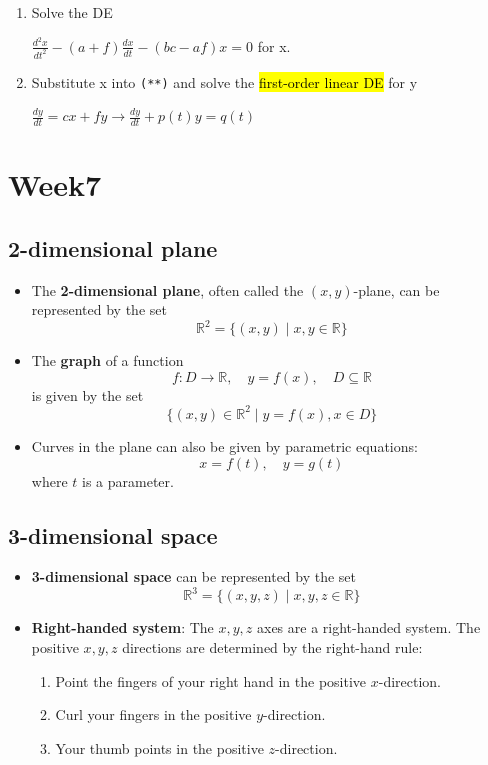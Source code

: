 \documentclass{article}
\begin{document}
\begin{itemize}
\begin{enumerate}
        \item Solve the DE   
          \begin{center}
            $\frac{d^2x}{dt^2} - (a+f)\frac{dx}{dt} - (bc-af)x = 0$ for x.
          \end{center}
        \item Substitute x into \texttt{(**)} and solve the \hl{first-order linear DE} for y
        \begin{center}
          $\frac{dy}{dt} = cx + fy \rightarrow \frac{dy}{dt} + p(t)y = q(t)$

        \end{center}       
      \end{enumerate}
    \end{itemize}

\section{Week7}
  \subsection*{2-dimensional plane}
    \begin{itemize}
      \item The \textbf{2-dimensional plane}, often called the $(x,y)$-plane, can be represented by the set
      \[
        \mathbb{R}^2 = \{(x,y) \mid x,y \in \mathbb{R}\}
      \]
      \item The \textbf{graph} of a function
      \[
        f: D \rightarrow \mathbb{R}, \quad y = f(x), \quad D \subseteq \mathbb{R}
      \]
      is given by the set
      \[
        \{(x,y) \in \mathbb{R}^2 \mid y = f(x), x \in D\}
      \]
      \item Curves in the plane can also be given by parametric equations:
      \[
        x = f(t), \quad y = g(t)
      \]
      where \( t \) is a parameter.
    \end{itemize}

  \subsection*{3-dimensional space}
    \begin{itemize}
      \item \textbf{3-dimensional space} can be represented by the set
      \[
        \mathbb{R}^3 = \{(x,y,z) \mid x,y,z \in \mathbb{R}\}
      \]
      \item \textbf{Right-handed system}: The \( x, y, z \) axes are a right-handed system. The positive \( x, y, z \) directions are determined by the right-hand rule:
        \begin{enumerate}
          \item Point the fingers of your right hand in the positive \( x \)-direction.
          \item Curl your fingers in the positive \( y \)-direction.
          \item Your thumb points in the positive \( z \)-direction.
        \end{enumerate}
    \end{itemize}
\end{document}
